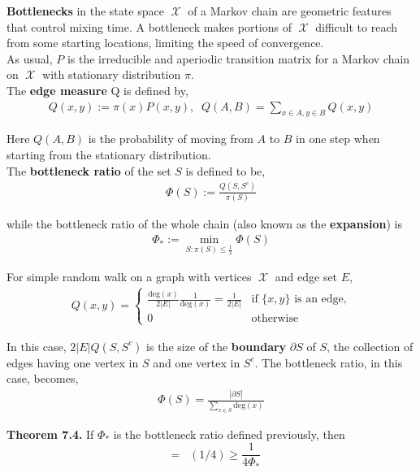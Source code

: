 \documentclass[12pt]{article}
\DeclareMathOperator*{\mix}{t_{\text{mix}}}
\DeclareMathOperator*{\X}{\mathcal{X}}
\begin{document}
\textbf{Bottlenecks} in the state space $\X$ of a Markov chain are geometric features that control mixing time. A bottleneck makes portions of $\X$ difficult to reach from some starting locations, limiting the speed of convergence.\\

As usual, $P$ is the irreducible and aperiodic transition matrix for a Markov chain on $\X$ with stationary distribution $\pi$.\\

The \textbf{edge measure} Q is defined by,
\begin{align*}
Q(x,y) := \pi(x) P(x,y), \; \; Q(A, B) = \sum_{x \in A, y \in B} Q(x,y)
\end{align*}

Here $Q(A, B)$ is the probability of moving from $A$ to $B$ in one step when starting from the stationary distribution.\\

The \textbf{bottleneck ratio} of the set $S$ is defined to be,
\begin{align*}
\Phi(S) := \frac{Q(S, S^c)}{\pi(S)}
\end{align*}

while the bottleneck ratio of the whole chain (also known as the \textbf{expansion}) is
\begin{align*}
\Phi_* := \min_{S: \pi(S) \leq \frac{1}{2}} \Phi(S)
\end{align*}

For simple random walk on a graph with vertices $\X$ and edge set $E$,
\begin{align*}
Q(x,y) = \begin{cases}
\frac{\text{deg}(x)}{2|E|} \frac{1}{\text{deg}(x)} = \frac{1}{2|E|} & \text{if } \{x, y\} \text{ is an edge,}\\
0 & \text{otherwise}
\end{cases}
\end{align*}

In this case, $2 |E| Q(S, S^c)$ is the size of the \textbf{boundary} $\partial S$ of $S$, the collection of edges having one vertex in $S$ and one vertex in $S^c$. The bottleneck ratio, in this case, becomes,
\begin{align*}
\Phi(S) = \frac{|\partial S|}{\sum_{x \in S} \text{deg}(x)}
\end{align*}

\textbf{Theorem 7.4.} If $\Phi_*$ is the bottleneck ratio defined previously, then $$\mix = \mix(1/4) \geq \frac{1}{4\Phi_*}$$
\end{document}
